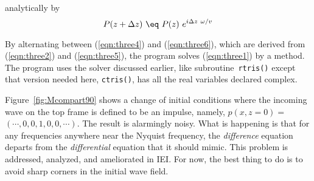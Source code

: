analytically by
\begin{equation}
P(z+ \Delta z) \  \eq \  P(z) \  e^{i \Delta z \ \omega / v }
\label{eqn:three6}
\end{equation}
\par
By alternating between (\ref{eqn:three4}) and (\ref{eqn:three6}),
which are derived from (\ref{eqn:three2}) and (\ref{eqn:three5}),
the program solves (\ref{eqn:three1}) by a  method.
The program uses the  solver discussed earlier,
like subroutine~\texttt{rtris()} 
except that version needed here, {\tt ctris()},
has all the real variables declared complex.
\par
Figure~\ref{fig:Mcompart90} shows a change of initial conditions
where the incoming wave on the top frame is defined to be an impulse,
namely, $p(x,z=0) =$ $(\cdots,0,0,1,0,0,\cdots)$.
The result is alarmingly noisy.
What is happening is that for any frequencies anywhere near
the Nyquist frequency,
the {\em  difference} equation departs from
the {\em  differential} equation that it should mimic.
This problem is addressed,
analyzed,
and ameliorated in IEI.
For now, the best thing to do is to avoid sharp corners
in the initial wave field.


